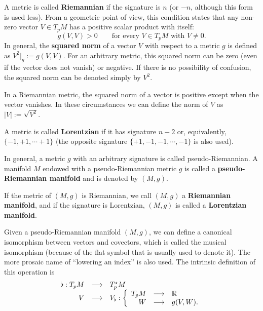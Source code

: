 \begin{points}
\item A metric is called \textbf{Riemannian} if the signature is $n$ (or $-n$, although this form is used less). From a geometric point of view, this condition states that any non-zero vector $V\in T_pM$ has a positive scalar product with itself:
\[
  g(V,V)>0\qquad\text{for every }V\in T_pM\text{ with }V\neq0 .
\]
In general, the \textbf{squared norm} of a vector $V$ with respect to a metric $g$ is defined as $V^2|_g:=g(V,V)$. For an arbitrary metric, this squared norm can be zero (even if the vector does not vanish) or negative. If there is no possibility of confusion, the squared norm can be denoted simply by $V^2$.

\item In a Riemannian metric, the squared norm of a vector is positive except when the vector vanishes. In these circumstances we can define the norm of $V$ as $|V|:=\sqrt{V^2}$.

\item A metric is called \textbf{Lorentzian} if it has signature $n-2$ or, equivalently, $\{-1,+1,\cdots+1\}$ (the opposite signature $\{+1,-1,-1,\cdots,-1\}$ is also used).

\item In general, a metric $g$ with an arbitrary signature is called pseudo-Riemannian. A manifold $M$ endowed with a pseudo-Riemannian metric $g$ is called a \textbf{pseudo-Riemannian manifold} and is denoted by $(M,g)$.

\item If the metric of $(M,g)$ is Riemannian, we call $(M,g)$ a \textbf{Riemannian manifold}, and if the signature is Lorentzian, $(M,g)$ is called a \textbf{Lorentzian manifold}.

\item Given a pseudo-Riemannian manifold $(M,g)$, we can define a canonical isomorphism between vectors and covectors, which is called the musical isomorphism (because of the flat symbol that is usually used to denote it). The more prosaic name of ``lowering an index'' is also used. The intrinsic definition of this operation is
\[
  \begin{array}{rcl}
  \flat:T_pM&\longrightarrow&T^\star_pM\\
  V&\longrightarrow&V_\flat:\left\{\begin{array}{rcl}T_pM&\longrightarrow&\mathbb{R}\\ W&\longrightarrow&g(V,W).\end{array}\right.
  \end{array}
\]


\end{points}
